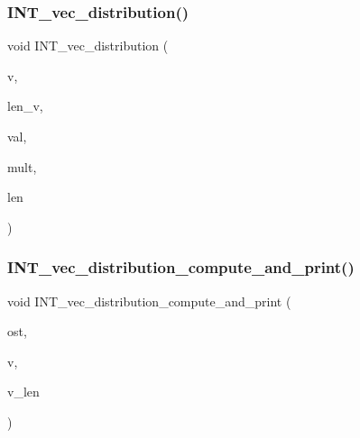 \subsubsection{\texorpdfstring{I\+N\+T\+\_\+vec\+\_\+distribution()}{INT\_vec\_distribution()}}
{\footnotesize\ttfamily void I\+N\+T\+\_\+vec\+\_\+distribution (\begin{DoxyParamCaption}\item[{\mbox{\hyperlink{galois_8h_a09fddde158a3a20bd2dcadb609de11dc}{I\+NT}} $\ast$}]{v,  }\item[{\mbox{\hyperlink{galois_8h_a09fddde158a3a20bd2dcadb609de11dc}{I\+NT}}}]{len\+\_\+v,  }\item[{\mbox{\hyperlink{galois_8h_a09fddde158a3a20bd2dcadb609de11dc}{I\+NT}} $\ast$\&}]{val,  }\item[{\mbox{\hyperlink{galois_8h_a09fddde158a3a20bd2dcadb609de11dc}{I\+NT}} $\ast$\&}]{mult,  }\item[{\mbox{\hyperlink{galois_8h_a09fddde158a3a20bd2dcadb609de11dc}{I\+NT}} \&}]{len }\end{DoxyParamCaption})}

\mbox{\label{util_8_c_a2b19a430ec12f29fe3527ab5776f0a1b}} 
\subsubsection{\texorpdfstring{I\+N\+T\+\_\+vec\+\_\+distribution\+\_\+compute\+\_\+and\+\_\+print()}{INT\_vec\_distribution\_compute\_and\_print()}}
{\footnotesize\ttfamily void I\+N\+T\+\_\+vec\+\_\+distribution\+\_\+compute\+\_\+and\+\_\+print (\begin{DoxyParamCaption}\item[{ostream \&}]{ost,  }\item[{\mbox{\hyperlink{galois_8h_a09fddde158a3a20bd2dcadb609de11dc}{I\+NT}} $\ast$}]{v,  }\item[{\mbox{\hyperlink{galois_8h_a09fddde158a3a20bd2dcadb609de11dc}{I\+NT}}}]{v\+\_\+len }\end{DoxyParamCaption})}

\mbox{\label{util_8_c_a786493580c7603ddd1e9e530f8a70bdd}} 

